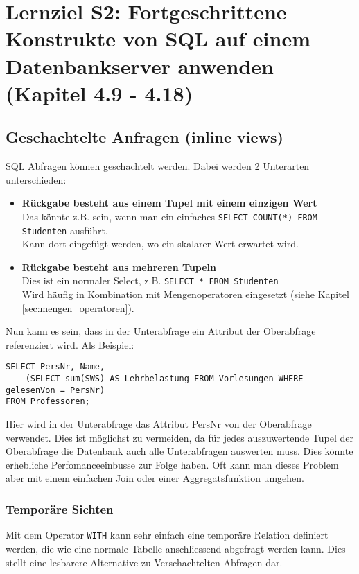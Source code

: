 \section{Lernziel S2: Fortgeschrittene Konstrukte von SQL auf einem Datenbankserver anwenden (Kapitel 4.9 - 4.18)}

\subsection{Geschachtelte Anfragen (inline views)}

SQL Abfragen können geschachtelt werden. Dabei werden 2 Unterarten unterschieden:

\begin{itemize}
  \item \textbf{Rückgabe besteht aus einem Tupel mit einem einzigen Wert} \\
  Das könnte z.B. sein, wenn man ein einfaches \texttt{SELECT COUNT(*) FROM Studenten} ausführt. \\
  Kann dort eingefügt werden, wo ein skalarer Wert erwartet wird.
  \item \textbf{Rückgabe besteht aus mehreren Tupeln} \\
  Dies ist ein normaler Select, z.B. \texttt{SELECT * FROM Studenten} \\
  Wird häufig in Kombination mit Mengenoperatoren eingesetzt (siehe Kapitel \ref{sec:mengen_operatoren}).
\end{itemize}

Nun kann es sein, dass in der Unterabfrage ein Attribut der Oberabfrage referenziert wird. Als Beispiel:

\begin{lstlisting}[caption={Korrelierte Unterabfrage},label=lst:unterabfrage_korreliert]
SELECT PersNr, Name,
	(SELECT sum(SWS) AS Lehrbelastung FROM Vorlesungen WHERE gelesenVon = PersNr)
FROM Professoren;
\end{lstlisting}

Hier wird in der Unterabfrage das Attribut PersNr von der Oberabfrage verwendet. Dies ist möglichst zu vermeiden, da für jedes auszuwertende Tupel der Oberabfrage die Datenbank auch alle Unterabfragen auswerten muss. Dies könnte erhebliche Perfomanceeinbusse zur Folge haben. Oft kann man dieses Problem aber mit einem einfachen Join oder einer Aggregatsfunktion umgehen.

\subsubsection{Temporäre Sichten}
Mit dem Operator \texttt{WITH} kann sehr einfach eine temporäre Relation definiert werden, die wie eine normale Tabelle anschliessend abgefragt werden kann. Dies stellt eine lesbarere Alternative zu Verschachtelten Abfragen dar.

